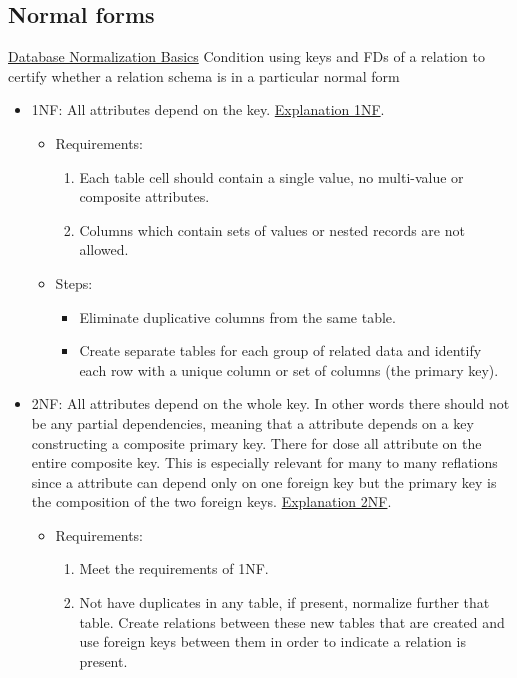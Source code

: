 \documentclass{article}
\begin{document}
\subsection{Normal forms}
\href{https://www.lifewire.com/database-normalization-basics-1019735}{Database Normalization Basics}
Condition using keys and FDs of a relation to
certify whether a relation schema is in a particular
normal form
\begin{itemize}
    \item 1NF: All attributes depend on the key. \href{https://www.youtube.com/watch?v=mUtAPbb1ECM}{Explanation 1NF}. 
    \begin{itemize}
        \item Requirements:
        \begin{enumerate}
            \item Each table cell should contain a single value, no multi-value or composite attributes.
            \item Columns which contain sets of values or nested records are not allowed.
        \end{enumerate}
        \item Steps:
        \begin{itemize}
            \item Eliminate duplicative columns from the same table.
            \item Create separate tables for each group of related data and identify each row with a unique column or set of columns (the primary key).
        \end{itemize}
    \end{itemize}
    \item 2NF: All attributes depend on the whole key. In other words
    there should not be any partial dependencies, meaning that a attribute
    depends on a key constructing a composite primary key. There for dose all 
    attribute on the entire composite key. This is especially relevant for 
    many to many reflations since a attribute can depend only on one foreign key 
    but the primary key is the composition of the two foreign keys.
    \href{https://www.youtube.com/watch?v=R7UblSu4744}{Explanation 2NF}.
    \begin{itemize}
        \item Requirements:
        \begin{enumerate}
            \item Meet the requirements of 1NF.
            \item Not have duplicates in any table, if present, normalize further that table. Create relations between these new tables that are created and use foreign keys between them in order to indicate a relation is present. 

\end{enumerate}
\end{itemize}
\end{itemize}
\end{document}
